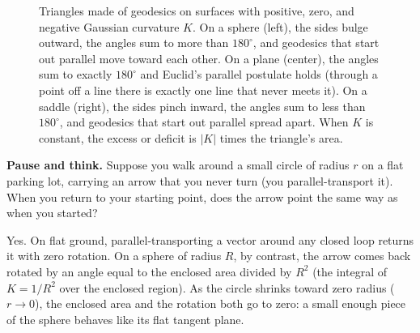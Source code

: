 \begin{figure}[htbp]
\caption{Triangles made of geodesics on surfaces with positive, zero, and negative Gaussian curvature $K$. On a sphere (left), the sides bulge outward, the angles sum to more than $180^\circ$, and geodesics that start out parallel move toward each other. On a plane (center), the angles sum to exactly $180^\circ$ and Euclid's parallel postulate holds (through a point off a line there is exactly one line that never meets it). On a saddle (right), the sides pinch inward, the angles sum to less than $180^\circ$, and geodesics that start out parallel spread apart. When $K$ is constant, the excess or deficit is $|K|$ times the triangle's area.}\label{23:fig-three-geometries}
\end{figure}

\begin{intuitionbox}
\textbf{Pause and think.} Suppose you walk around a small circle of radius $r$ on a flat parking lot, carrying an arrow that you never turn (you parallel-transport it). When you return to your starting point, does the arrow point the same way as when you started?

Yes. On flat ground, parallel-transporting a vector around any closed loop returns it with zero rotation. On a sphere of radius $R$, by contrast, the arrow comes back rotated by an angle equal to the enclosed area divided by $R^2$ (the integral of $K = 1/R^2$ over the enclosed region). As the circle shrinks toward zero radius ($r \to 0$), the enclosed area and the rotation both go to zero: a small enough piece of the sphere behaves like its flat tangent plane.
\end{intuitionbox}

